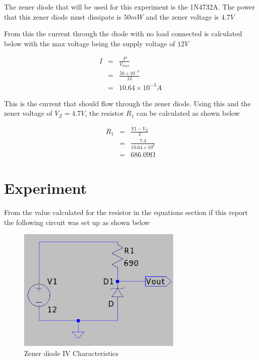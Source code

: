 \documentclass[12pt, a4paper]{article}
\begin{document}
		The zener diode that will be used for this experiment is the 1N4732A. The power that this zener diode must dissipate is $50mW$ and the zener voltage is $4.7V$

		From this the current through the diode with no load connected is calculated below with the max voltage being the supply voltage of $12V$

		\begin{equation}
			\begin{array}{rcl}
				I & = & \frac{P}{V_{max}}\\
				& = & \frac{50\times10^{-3}}{12}\\
				& = & 10.64 \times 10^{-3}A
			\end{array}
		\end{equation}  

		This is the current that should flow through the zener diode. Using this and the zener voltage of $V_Z = 4.7V$, the resistor $R_1$ can be calculated as shown below

		\begin{equation}
			\begin{array}{rcl}
				R_1 & = & \frac{V1 - V_Z}{I}\\
				& = & \frac{7.3}{10.64\times10^{3}}\\
				& = & 686.09 \si{\ohm}
			\end{array}
		\end{equation}  

	\section{Experiment} %
	\label{sec:experiment}
		From the value calculated for the resistor in the equations section if this report the following circuit was set up as shown below

		\begin{figure}[H]
			\centering
			\includegraphics[width=0.7\textwidth]{Images/Part_1_Experiment.png}
			\caption{Zener diode IV Characteristics}
			\label{fig:part_1_experiment}
		\end{figure}
\end{document}

